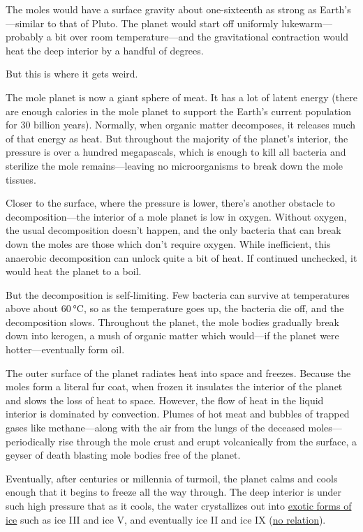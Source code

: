 {The moles would have a surface gravity about one-sixteenth as strong as Earth’s—similar to that of Pluto. The planet would start off uniformly lukewarm—probably a bit over room temperature—and the gravitational contraction would heat the deep interior by a handful of degrees.}

{But this is where it gets weird.}

{The mole planet is now a giant sphere of meat. It has a lot of latent energy (there are enough calories in the mole planet to support the Earth’s current population for 30 billion years). Normally, when organic matter decomposes, it releases much of that energy as heat. But throughout the majority of the planet’s interior, the pressure is over a hundred megapascals, which is enough to kill all bacteria and sterilize the mole remains—leaving no microorganisms to break down the mole tissues.}

{Closer to the surface, where the pressure is lower, there’s another obstacle to decomposition—the interior of a mole planet is low in oxygen. Without oxygen, the usual decomposition doesn’t happen, and the only bacteria that can break down the moles are those which don’t require oxygen. While inefficient, this anaerobic decomposition can unlock quite a bit of heat. If continued unchecked, it would heat the planet to a boil.}

{But the decomposition is self-limiting. Few bacteria can survive at temperatures above about 60 °C, so as the temperature goes up, the bacteria die off, and the decomposition slows. Throughout the planet, the mole bodies gradually break down into kerogen, a mush of organic matter which would—if the planet were hotter—eventually form oil.}

{The outer surface of the planet radiates heat into space and freezes. Because the moles form a literal fur coat, when frozen it insulates the interior of the planet and slows the loss of heat to space. However, the flow of heat in the liquid interior is dominated by convection. Plumes of hot meat and bubbles of trapped gases like methane—along with the air from the lungs of the deceased moles—periodically rise through the mole crust and erupt volcanically from the surface, a geyser of death blasting mole bodies free of the planet.}

{Eventually, after centuries or millennia of turmoil, the planet calms and cools enough that it begins to freeze all the way through. The deep interior is under such high pressure that as it cools, the water crystallizes out into \href{http://en.wikipedia.org/wiki/Ice\#Phases}{exotic forms of ice} such as ice III and ice V, and eventually ice II and ice IX (\href{http://en.wikipedia.org/wiki/Ice-nine}{no relation}).}

